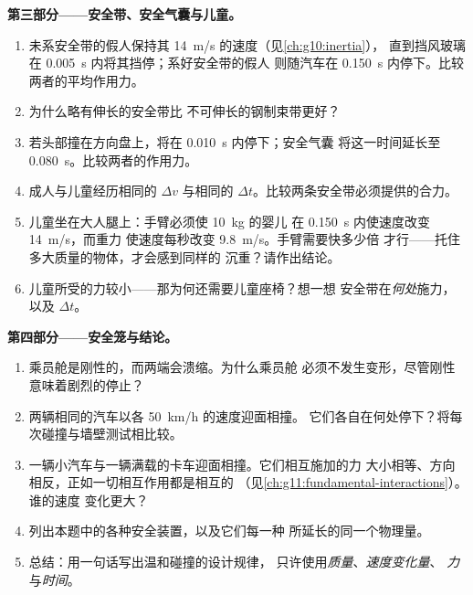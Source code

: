 \begin{problem}
\medskip
\noindent\textbf{第三部分——安全带、安全气囊与儿童。}
\begin{enumerate}[resume]
  \item 未系安全带的假人保持其 \qty{14}{m/s} 的速度（见\cref{ch:g10:inertia}），
        直到挡风玻璃在 \qty{0.005}{s} 内将其挡停；系好安全带的假人
        则随汽车在 \qty{0.150}{s} 内停下。比较两者的平均作用力。
  \item 为什么略有伸长的安全带比
        不可伸长的钢制束带更好？
  \item 若头部撞在方向盘上，将在 \qty{0.010}{s} 内停下；安全气囊
        将这一时间延长至 \qty{0.080}{s}。比较两者的作用力。
  \item 成人与儿童经历相同的 $\Delta v$ 与相同的
        $\Delta t$。比较两条安全带必须提供的合力。
  \item 儿童坐在大人腿上：手臂必须使 \qty{10}{kg} 的婴儿
        在 \qty{0.150}{s} 内使速度改变 \qty{14}{m/s}，而重力
        使速度每秒改变 \qty{9.8}{m/s}。手臂需要快多少倍
        才行——托住多大质量的物体，才会感到同样的
        沉重？请作出结论。
  \item 儿童所受的力较小——那为何还需要儿童座椅？想一想
        安全带在\emph{何处}施力，以及 $\Delta t$。
\end{enumerate}

\medskip
\noindent\textbf{第四部分——安全笼与结论。}
\begin{enumerate}[resume]
  \item 乘员舱是刚性的，而两端会溃缩。为什么乘员舱
        必须不发生变形，尽管刚性意味着剧烈的停止？
  \item 两辆相同的汽车以各 \qty{50}{km/h} 的速度迎面相撞。
        它们各自在何处停下？将每次碰撞与墙壁测试相比较。
  \item 一辆小汽车与一辆满载的卡车迎面相撞。它们相互施加的力
        大小相等、方向相反，正如一切相互作用都是相互的
        （见\cref{ch:g11:fundamental-interactions}）。谁的速度
        变化更大？
  \item 列出本题中的各种安全装置，以及它们每一种
        所延长的同一个物理量。
  \item 总结：用一句话写出温和碰撞的设计规律，
        只许使用\emph{质量}、\emph{速度变化量}、
        \emph{力}与\emph{时间}。
\end{enumerate}
\end{problem}
